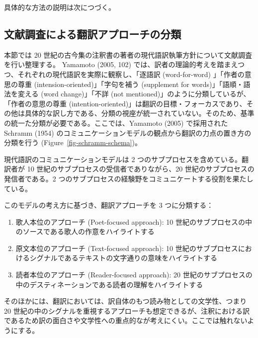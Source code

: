 \documentclass[
  letterpaper,
  DIV=11,
  numbers=noendperiod]{scrartcl}
\providecommand{\tightlist}{%
  \setlength{\itemsep}{0pt}\setlength{\parskip}{0pt}}\usepackage{longtable,booktabs,array}
\begin{document}
具体的な方法の説明は次につづく。

\subsection{文献調査による翻訳アプローチの分類}\label{ux6587ux732eux8abfux67fbux306bux3088ux308bux7ffbux8a33ux30a2ux30d7ux30edux30fcux30c1ux306eux5206ux985e}

本節では 20
世紀の古今集の注釈書の著者の現代語訳執筆方針について文献調査を行い整理する。
Yamamoto (2005, 102)
では、訳者の理論的考えを踏まえつつ、それぞれの現代語訳を実際に観察し、「逐語訳
(word-for-word) 」「作者の意思の尊重 (intension-oriented)」「字句を補う
(supplement for words)」「語順・語法を変える (word change)」「不詳 (not
mentioned)」のように分類しているが、「作者の意思の尊重
(intention-oriented)」は翻訳の目標・フォーカスであり、その他は具体的な訳し方である、分類の視座が統一されていない。そのため、基準の統一た分類が必要である。ここでは、Yamamoto
(2005) で採用された Schramm (1954)
のコミュニケーションモデルの観点から翻訳の力点の置き方の分類を行う
(Figure~\ref{fig-schramm-schema})。

現代語訳のコミュニケーションモデルは 2
つのサブプロセスを含めている。翻訳者が 10
世紀のサブプロセスの受信者でありながら、20
世紀のサブプロセスの発信者である。2
つのサブプロセスの経験野をコミュニケートする役割を果たしている。

このモデルの考え方に基づき、翻訳アプローチを 3 つに分類する：

\begin{enumerate}
\def\labelenumi{\arabic{enumi}.}
\tightlist
\item
  歌人本位のアプローチ (Poet-focused approach): 10
  世紀のサブプロセスの中のソースである歌人の作意をハイライトする
\item
  原文本位のアプローチ (Text-focused approach): 10
  世紀のサブプロセスにおけるシグナルであるテキストの文字通りの意味をハイライトする
\item
  読者本位のアプローチ (Reader-focused approach): 20
  世紀のサブプロセスの中のデスティネーションである読者の理解をハイライトする
\end{enumerate}

そのほかには、翻訳においては、訳自体のもつ読み物としての文学性、つまり
20
世紀の中のシグナルを重視するアプローチも想定できるが、注釈における訳であるため訳の面白さや文学性への重点的なが考えにくい。ここでは触れないようにする。
\end{document}
